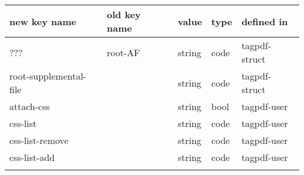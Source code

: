 \begin{tabular}{lllll}
\toprule
new key name    & old key name & value            &type   & defined in \\\midrule
 ???            & root-AF      & string           &code   &tagpdf-struct\\
root-supplemental-file &       & string           &code   &tagpdf-struct\\
attach-css      &              & string           &bool   &tagpdf-user\\
css-list        &              & string           &code   &tagpdf-user\\ 
css-list-remove &              & string           &code   &tagpdf-user\\
css-list-add    &              & string           &code   &tagpdf-user\\
 \\[4pt]\midrule


\end{tabular}
